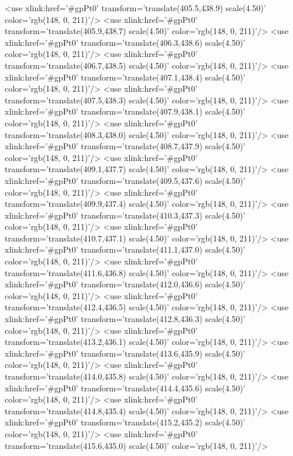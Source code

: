 	<use xlink:href='#gpPt0' transform='translate(405.5,438.9) scale(4.50)' color='rgb(148,   0, 211)'/>
	<use xlink:href='#gpPt0' transform='translate(405.9,438.7) scale(4.50)' color='rgb(148,   0, 211)'/>
	<use xlink:href='#gpPt0' transform='translate(406.3,438.6) scale(4.50)' color='rgb(148,   0, 211)'/>
	<use xlink:href='#gpPt0' transform='translate(406.7,438.5) scale(4.50)' color='rgb(148,   0, 211)'/>
	<use xlink:href='#gpPt0' transform='translate(407.1,438.4) scale(4.50)' color='rgb(148,   0, 211)'/>
	<use xlink:href='#gpPt0' transform='translate(407.5,438.3) scale(4.50)' color='rgb(148,   0, 211)'/>
	<use xlink:href='#gpPt0' transform='translate(407.9,438.1) scale(4.50)' color='rgb(148,   0, 211)'/>
	<use xlink:href='#gpPt0' transform='translate(408.3,438.0) scale(4.50)' color='rgb(148,   0, 211)'/>
	<use xlink:href='#gpPt0' transform='translate(408.7,437.9) scale(4.50)' color='rgb(148,   0, 211)'/>
	<use xlink:href='#gpPt0' transform='translate(409.1,437.7) scale(4.50)' color='rgb(148,   0, 211)'/>
	<use xlink:href='#gpPt0' transform='translate(409.5,437.6) scale(4.50)' color='rgb(148,   0, 211)'/>
	<use xlink:href='#gpPt0' transform='translate(409.9,437.4) scale(4.50)' color='rgb(148,   0, 211)'/>
	<use xlink:href='#gpPt0' transform='translate(410.3,437.3) scale(4.50)' color='rgb(148,   0, 211)'/>
	<use xlink:href='#gpPt0' transform='translate(410.7,437.1) scale(4.50)' color='rgb(148,   0, 211)'/>
	<use xlink:href='#gpPt0' transform='translate(411.1,437.0) scale(4.50)' color='rgb(148,   0, 211)'/>
	<use xlink:href='#gpPt0' transform='translate(411.6,436.8) scale(4.50)' color='rgb(148,   0, 211)'/>
	<use xlink:href='#gpPt0' transform='translate(412.0,436.6) scale(4.50)' color='rgb(148,   0, 211)'/>
	<use xlink:href='#gpPt0' transform='translate(412.4,436.5) scale(4.50)' color='rgb(148,   0, 211)'/>
	<use xlink:href='#gpPt0' transform='translate(412.8,436.3) scale(4.50)' color='rgb(148,   0, 211)'/>
	<use xlink:href='#gpPt0' transform='translate(413.2,436.1) scale(4.50)' color='rgb(148,   0, 211)'/>
	<use xlink:href='#gpPt0' transform='translate(413.6,435.9) scale(4.50)' color='rgb(148,   0, 211)'/>
	<use xlink:href='#gpPt0' transform='translate(414.0,435.8) scale(4.50)' color='rgb(148,   0, 211)'/>
	<use xlink:href='#gpPt0' transform='translate(414.4,435.6) scale(4.50)' color='rgb(148,   0, 211)'/>
	<use xlink:href='#gpPt0' transform='translate(414.8,435.4) scale(4.50)' color='rgb(148,   0, 211)'/>
	<use xlink:href='#gpPt0' transform='translate(415.2,435.2) scale(4.50)' color='rgb(148,   0, 211)'/>
	<use xlink:href='#gpPt0' transform='translate(415.6,435.0) scale(4.50)' color='rgb(148,   0, 211)'/>
